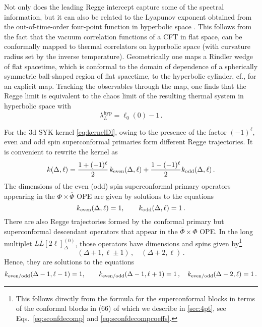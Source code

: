 \documentclass[11pt]{article}
\newcommand{\Phib}{\overline{\Phi}}
\begin{document}
Not only does the leading Regge intercept capture some of the spectral information, but it can also be related to the Lyapunov exponent obtained from the out-of-time-order four-point function in hyperbolic space \cite{Murugan:2017eto}. This follows from the fact that the vacuum correlation functions of a CFT in flat space, can be conformally mapped to thermal correlators on hyperbolic space (with curvature radius set by the inverse temperature). Geometrically one maps a Rindler wedge of flat spacetime, which is conformal to the domain of dependence of a spherically symmetric ball-shaped region of flat spacetime, to the hyperbolic cylinder, cf., \cite{Casini:2011kv} for an explicit map. Tracking the observables through the map, one finds that the Regge limit is equivalent to the chaos limit of the resulting thermal system in hyperbolic space with 
%
\begin{equation}\label{eq:lamhyp}
\lambda_L^\text{hyp} = \ell_0(0) -1 \,.
\end{equation}	
%

For the 3d SYK kernel \eqref{eq:kernelDl}, owing to the presence of the factor $(-1)^\ell$, even and odd spin superconformal primaries form different Regge trajectories. It is convenient to rewrite the kernel as
%
\begin{equation}
k(\Delta,\ell) = \frac{1+(-1)^\ell}{2} \, k_{\rm even}(\Delta,\ell)+  \frac{1 - (-1)^\ell}{2}k_{\rm odd}(\Delta,\ell) \,.
\end{equation}	
%
The dimensions of the even (odd) spin superconformal primary operators appearing in the $\Phi\times\Phib$ OPE are given by solutions to the equations
%
\begin{equation}
k_{\rm even}(\Delta,\ell)=1,\qquad k_{\rm odd}(\Delta,\ell)=1 \,.
\end{equation}	
%
There are also Regge trajectories formed by the conformal primary but superconformal descendant operators that appear in the $\overline\Phi\times\Phi$ OPE. In the long multiplet $L\overline L[2\ell]^{(0)}_{\Delta}$, those operators have dimensions and spins given by\footnote{This follows directly from the formula for the superconformal blocks in terms of the conformal blocks in (66) of \cite{Bobev:2015jxa} which we describe in \cref{sec:4pt}, see  Eqs.~\eqref{eq:sconfdecomp} and \eqref{eq:sconfdecompcoeffs}.}
%
\begin{equation}
(\Delta+1,\ell\pm 1)\,,\quad(\Delta+2,\ell)\,.
\end{equation}	
%
Hence, they are solutions to the equations
%
\begin{equation}
k_{\rm even/odd}(\Delta-1,\ell-1)=1,\qquad k_{\rm even/odd}(\Delta-1,\ell+1)=1\,,\quad k_{\rm even/odd}(\Delta-2,\ell)=1\,.
\end{equation}	
%
\end{document}

